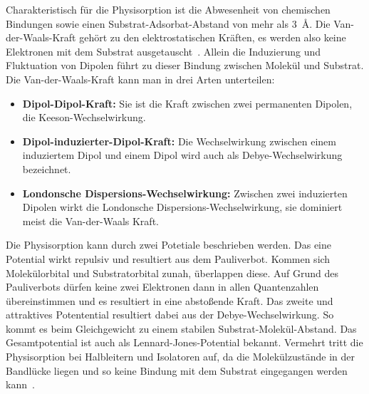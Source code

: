             Charakteristisch für die Physisorption ist die Abwesenheit von chemischen Bindungen sowie einen Substrat-Adsorbat-Abstand von mehr als \SI{3}{\angstrom}. %
            Die Van-der-Waals-Kraft gehört zu den elektrostatischen Kräften, es werden also keine Elektronen mit dem Substrat ausgetauscht~\cite{bergenti_spinterface_2019}.
            Allein die Induzierung und Fluktuation von Dipolen führt zu dieser Bindung zwischen Molekül und Substrat.
            Die Van-der-Waals-Kraft kann man in drei Arten unterteilen:
            \begin{itemize}
                \item \textbf{Dipol-Dipol-Kraft:} Sie ist die Kraft zwischen zwei permanenten Dipolen, die Keeson-Wechselwirkung.
                \item \textbf{Dipol-induzierter-Dipol-Kraft:} Die Wechselwirkung zwischen einem induziertem Dipol und einem Dipol wird auch als Debye-Wechselwirkung bezeichnet.
                \item \textbf{Londonsche Dispersions-Wechselwirkung:} Zwischen zwei induzierten Dipolen wirkt die Londonsche Dispersions-Wechselwirkung, sie dominiert meist die Van-der-Waals Kraft.
            \end{itemize}

            Die Physisorption kann durch zwei Potetiale beschrieben werden.
            Das eine Potential wirkt repulsiv und resultiert aus dem Pauliverbot.
            Kommen sich Molekülorbital und Substratorbital zunah, überlappen diese.
            Auf Grund des Pauliverbots dürfen keine zwei Elektronen dann in allen Quantenzahlen übereinstimmen und es resultiert in eine abstoßende Kraft.
            Das zweite und attraktives Potentential resultiert dabei aus der Debye-Wechselwirkung.
            So kommt es beim Gleichgewicht zu einem stabilen Substrat-Molekül-Abstand.
            Das Gesamtpotential ist auch als Lennard-Jones-Potential bekannt.
            Vermehrt tritt die Physisorption bei Halbleitern und Isolatoren auf, da die Molekülzustände in der Bandlücke liegen und so keine Bindung mit dem Substrat eingegangen werden kann~\cite{IF_1}.
        
